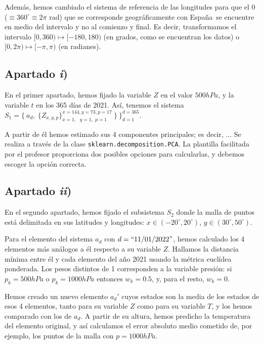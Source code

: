 \documentclass[a4paper]{article}
\begin{document}
	Además, hemos cambiado el sistema de referencia de las longitudes para que el 0 ($\equiv 360^\circ\equiv 2\pi$ rad) \textemdash que se corresponde geográficamente con España\textemdash~se encuentre en medio del intervalo y no al comienzo y final. Es decir, transformamos el intervalo $[0,360) \mapsto[-180,180)$ (en grados, como se encuentran los datos) o $[0,2\pi) \mapsto[-\pi,\pi)$ (en radianes).
	
	\subsection{Apartado \textit{i})}
	En el primer apartado, hemos fijado la variable $Z$ en el valor $500hPa$, y la variable $t$ en los 365 días de 2021. Así, tenemos el sistema $S_1 = \{\ a_d,\ \{Z_{x,y,p}\}_{x=1, \hspace{8pt} y=1, \hspace{4pt} p=1}^{x=144,y=73,p=17}\ \}\ \}_{d=1}^{d=365}$.
	
	A partir de él hemos estimado sus 4 componentes principales; es decir, ...%
	Se realiza a través de la clase \verb+sklearn.decomposition.PCA+. La plantilla facilitada por el profesor proporciona dos posibles opciones para calcularlas, y debemos escoger la opción correcta.
	
	
	\subsection{Apartado \textit{ii})}
	En el segundo apartado, hemos fijado el subsistema $S_2$ donde la malla de puntos está delimitada en sus latitudes y longitudes: $x \in (−20^\circ , 20^\circ )$, $y \in (30^\circ , 50^\circ )$.
	
	Para el elemento del sistema $a_d$ con $d=``11/01/2022"$, hemos calculado los 4 elementos más análogos a él respecto a su variable $Z$. Hallamos la distancia mínima entre él y cada elemento del año 2021 usando la métrica euclídea ponderada. Los pesos distintos de 1 corresponden a la variable presión: si $p_k=500hPa$ o $p_k=1000hPa$ entonces $w_k = 0.5$, y, para el resto, $w_k=0$.
	
	Hemos creado un nuevo elemento $a_d'$ cuyos estados son la media de los estados de esos 4 elementos, tanto para su variable $Z$ como para su variable $T$, y los hemos comparado con los de $a_d$. A partir de su altura, hemos predicho la temperatura del elemento original, y así calculamos el error absoluto medio cometido de, por ejemplo, los puntos de la malla con $p=1000hPa$.
	
\end{document}
